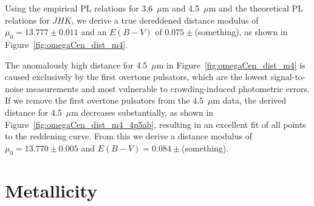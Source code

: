 \documentclass[a4paper,fleqn,usenatbib]{mnras}
\begin{document}
Using the empirical PL relations for 3.6~$\mu$m and 4.5~$\mu$m and the theoretical PL relations for $J\!H\!K$, we derive a true dereddened distance modulus of $\mu_0 = 13.777 \pm 0.011$ and an $E(B-V)$ of $0.075 \pm $(something), as shown in Figure~\ref{fig:omegaCen_dist_m4}.

The anomalously high distance for 4.5~$\mu$m in Figure~\ref{fig:omegaCen_dist_m4} is caused exclusively by the first overtone pulsators, which are the lowest signal-to-noise measurements and most vulnerable to crowding-induced photometric errors. If we remove the first overtone pulsators from the 4.5~$\mu$m data, the derived distance for 4.5~$\mu$m decreases substantially, as shown in Figure~\ref{fig:omegaCen_dist_m4_4p5ab}, resulting in an excellent fit of all points to the reddening curve. From this we derive a distance modulus of $\mu_0 = 13.770 \pm 0.005$ and $E(B-V) = 0.084 \pm$(something).

\section{Metallicity}
\label{sec:metallicity}



\end{document}

